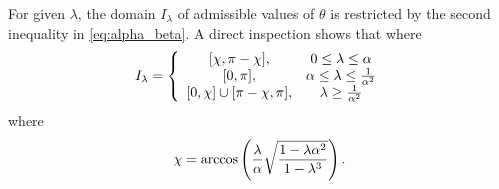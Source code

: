 \documentclass{article}
\begin{document}
For given $\lambda$, the domain $I_{\lambda}$ of admissible values of $%
\theta $ is restricted by the second inequality in \eqref{eq:alpha_beta}. A
direct inspection shows that where 
\begin{equation}
I_{\lambda }=\left\{ 
\begin{array}{cc}
\lbrack \chi ,\pi -\chi ], & 0\leq \lambda\leq \alpha \\ 
\lbrack 0,\pi ], & \alpha \leq \lambda \leq \frac{1}{\alpha^2 } \\ 
\lbrack 0,\chi ]\cup \lbrack \pi -\chi ,\pi ], & \lambda\geq \frac{1}{%
\alpha^2 }%
\end{array}%
\right.
\end{equation}%
where%
\begin{equation}
\chi =\arccos \left(\frac{\lambda}{\alpha}\sqrt{\frac{1-\lambda \alpha^2 }{%
1-\lambda^3}}\right).  \label{eq:chi}
\end{equation}
\end{document}
